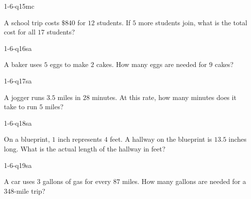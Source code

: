 \begin{practiceQuestion}{1-6-q15}{mc}
\begin{questionText}
A school trip costs $\$840$ for $12$ students. If $5$ more students join, what is the total cost for all $17$ students?
\end{questionText}
\end{practiceQuestion}


\begin{practiceQuestion}{1-6-q16}{sa}
\begin{questionText}
A baker uses $5$ eggs to make $2$ cakes. How many eggs are needed for $9$ cakes?
\end{questionText}
\end{practiceQuestion}

\begin{practiceQuestion}{1-6-q17}{sa}
\begin{questionText}
A jogger runs $3.5$ miles in $28$ minutes. At this rate, how many minutes does it take to run $5$ miles?
\end{questionText}
\end{practiceQuestion}

\begin{practiceQuestion}{1-6-q18}{sa}
\begin{questionText}
On a blueprint, $1$ inch represents $4$ feet. A hallway on the blueprint is $13.5$ inches long. What is the actual length of the hallway in feet?
\end{questionText}
\end{practiceQuestion}

\begin{practiceQuestion}{1-6-q19}{sa}
\begin{questionText}
A car uses $3$ gallons of gas for every $87$ miles. How many gallons are needed for a $348$-mile trip?
\end{questionText}
\end{practiceQuestion}

